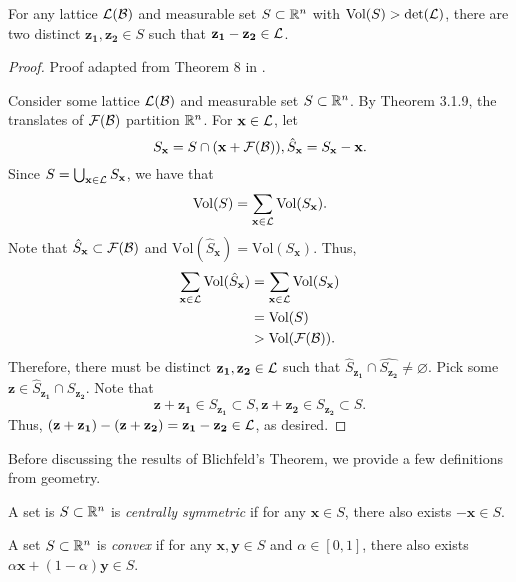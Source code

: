 \documentclass[a4paper,12pt]{article}
\begin{document}
\begin{thm}\label{Blichfeld}
    For any lattice $\mathcal{L}(\mathcal{B})$ and measurable set $S \subset \mathbb{R}^n$ with $\text{Vol}(S) > \text{det}(\mathcal{L})$, there are two distinct $\mathbf{z_1},\mathbf{z_2} \in S$ such that $\mathbf{z_1} - \mathbf{z_2} \in \mathcal{L}$. 
\end{thm}
 
\begin{proof}
    Proof adapted from Theorem 8 in \cite{RegevIntro}.
    
    Consider some lattice $\mathcal{L}(\mathcal{B})$ and measurable set $S \subset \mathbb{R}^n$. By Theorem 3.1.9, the translates of $\mathcal{F}(\mathcal{B})$ partition $\mathbb{R}^n$. For $\mathbf{x}\in \mathcal{L}$, let $$S_\mathbf{x} = S \cap (\mathbf{x} + \mathcal{F}(\mathcal{B})), \hat{S}_\mathbf{x} = S_\mathbf{x} - \mathbf{x}.$$ Since $S = \bigcup_{\mathbf{x}\in\mathcal{L}}S_\mathbf{x}$, we have that $$\text{Vol}(S) = \sum_{\mathbf{x}\in\mathcal{L}}\text{Vol}(S_\mathbf{x}).$$ Note that $\hat{S}_\mathbf{x} \subset \mathcal{F}(\mathcal{B})$ and $\text{Vol}(\hat{S}_\mathbf{x}) = \text{Vol}(S_\mathbf{x})$. Thus, 
    \begin{align*}
        \sum_{\mathbf{x}\in\mathcal{L}}\text{Vol}(\hat{S}_\mathbf{x}) &= \sum_{\mathbf{x}\in\mathcal{L}}\text{Vol}(S_\mathbf{x}) \\
        &= \text{Vol}(S) \\
        &> \text{Vol}(\mathcal{F}(\mathcal{B})).
    \end{align*}
    Therefore, there must be distinct $\mathbf{z_{1}},\mathbf{z_{2}} \in \mathcal{L}$ such that $\hat{S}_\mathbf{z_1} \cap \hat{S_\mathbf{z_2}} \neq \varnothing$. Pick some $\mathbf{z} \in \hat{S}_\mathbf{z_1} \cap S_\mathbf{z_2}$. Note that $$\mathbf{z} + \mathbf{z_1} \in S_\mathbf{z_1} \subset S, \mathbf{z} + \mathbf{z_2} \in S_\mathbf{z_2} \subset S.$$ Thus, $(\mathbf{z}+\mathbf{z_1})-(\mathbf{z}+\mathbf{z_2}) = \mathbf{z_1}-\mathbf{z_2} \in \mathcal{L}$, as desired.
\end{proof}

Before discussing the results of Blichfeld's Theorem, we provide a few definitions from geometry. 

\begin{defn}
    A set is $S \subset \mathbb{R}^n$ is \textit{centrally symmetric} if for any $\mathbf{x}\in S$, there also exists $\mathbf{-x} \in S$.
\end{defn}

\begin{defn}
    A set $S \subset \mathbb{R}^n$ is \textit{convex} if for any $\mathbf{x},\mathbf{y}\in S$ and $\alpha \in [0,1]$, there also exists $\alpha \mathbf{x} + (1-\alpha)\mathbf{y} \in S$.
\end{defn}
\end{document}
